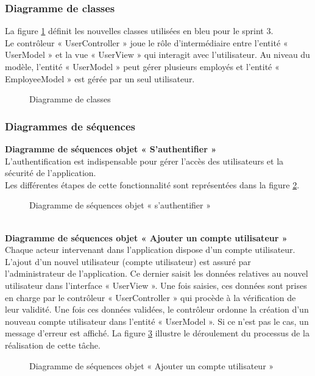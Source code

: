 \subsubsection{Diagramme de classes}
La figure \ref{fig:diagclasse3_new_3} définit les nouvelles classes utilisées en bleu pour le sprint 3.\\
Le contrôleur « UserController » joue le rôle d’intermédiaire entre l'entité « UserModel » et la
vue \newline « UserView » qui interagit avec l’utilisateur.
Au niveau du modèle, l’entité « UserModel » peut gérer plusieurs employés et l’entité «
EmployeeModel » est gérée par un seul utilisateur.
\begin{figure}[htpb]
    \centering
    \caption{Diagramme de classes}
    \label{fig:diagclasse3_new_3}
    \end{figure}
\newpage
\subsubsection{Diagrammes de séquences}

\textbf{Diagramme de séquences objet « S'authentifier »}\\
L'authentification est indispensable pour gérer l'accès des utilisateurs et la sécurité de l’application.\\
Les différentes étapes de cette fonctionnalité sont représentées dans la figure \ref{fig:seqobjetauthentifier}.
  \begin{figure}[htpb]
    \centering
    \caption{Diagramme de séquences objet « s'authentifier »}
    \label{fig:seqobjetauthentifier}
    \end{figure}
\\
\textbf{Diagramme de séquences objet « Ajouter un compte utilisateur »}\\
Chaque acteur intervenant dans l’application dispose d’un compte utilisateur. L’ajout d’un nouvel utilisateur (compte utilisateur) est assuré par l’administrateur de l’application. Ce dernier saisit les données relatives au nouvel utilisateur dans l'interface « UserView ». Une fois saisies, ces données sont prises en charge par le contrôleur « UserController » qui procède à la vérification de leur validité.\newline
Une fois ces données validées, le contrôleur ordonne la création d’un nouveau compte utilisateur dans l'entité « UserModel ». Si ce n'est pas le cas, un message d’erreur est affiché.\newline
La figure \ref{fig:diagseqobjetAjouterUtilisateur} illustre le déroulement du processus de la réalisation de cette tâche.
\newpage
 \begin{figure}[htpb]
    \centering
    \caption{Diagramme de séquences objet « Ajouter un compte utilisateur »}
    \label{fig:diagseqobjetAjouterUtilisateur}
    \end{figure}

